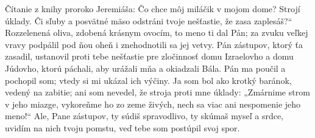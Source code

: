 Čítanie z knihy proroko Jeremiáša:
Čo chce môj miláčik v mojom dome?
Strojí úklady.
Či sľuby a posvätné mäso
odstráni tvoje nešťastie,
že zasa zaplesáš?“
Rozzelenená oliva,
zdobená krásnym ovocím,
to meno ti dal Pán;
za zvuku veľkej vravy
podpálil pod ňou oheň
i znehodnotili sa jej vetvy.
Pán zástupov, ktorý ťa zasadil, ustanovil proti tebe nešťastie pre zločinnosť domu Izraelovho a domu Júdovho, ktorú páchali, aby urážali mňa a okiadzali Bála.
Pán ma poučil a pochopil som;
vtedy si mi ukázal ich výčiny.
Ja som bol ako krotký baránok,
vedený na zabitie;
ani som nevedel,
že stroja proti mne úklady:
„Zmárnime strom v jeho miazge,
vykoreňme ho zo zeme živých,
nech sa viac ani nespomenie jeho meno!“
Ale, Pane zástupov, ty súdiš spravodlivo,
ty skúmaš myseľ a srdce,
uvidím na nich tvoju pomstu,
veď tebe som postúpil svoj spor.
